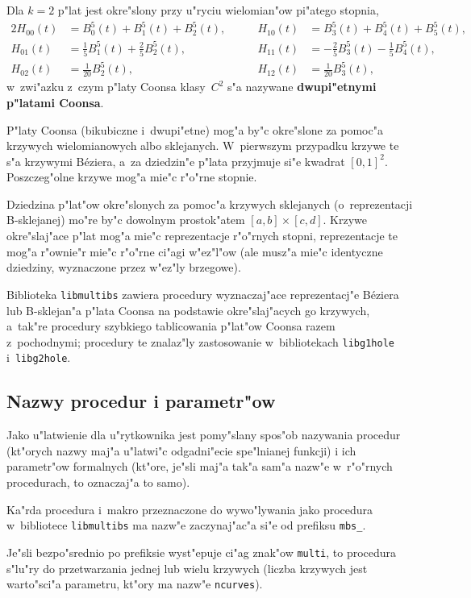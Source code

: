 Dla $k=2$ p"lat jest okre"slony przy u"ryciu wielomian"ow pi"atego stopnia,
\begin{alignat*}{2}
  H_{00}(t) &{}= B^5_0(t)+B^5_1(t)+B^5_2(t),\qquad &
  H_{10}(t) &{}= B^5_3(t)+B^5_4(t)+B^5_5(t), \\
  H_{01}(t) &{}= \frac{1}{5}B^5_1(t)+\frac{2}{5}B^5_2(t), \qquad &
  H_{11}(t) &{}= -\frac{2}{5}B^5_3(t)-\frac{1}{5}B^5_4(t), \\
  H_{02}(t) &{}= \frac{1}{20}B^5_2(t), \qquad &
  H_{12}(t) &{}= \frac{1}{20}B^5_3(t),
\end{alignat*}
w~zwi"azku z~czym p"laty Coonsa klasy~$C^2$ s"a nazywane \textbf{dwupi"etnymi
p"latami Coonsa}.

P"laty Coonsa (bikubiczne i~dwupi"etne) mog"a by"c okre"slone za pomoc"a
krzywych wielomianowych albo sklejanych. W~pierwszym przypadku krzywe te s"a
krzywymi B\'{e}ziera, a~za dziedzin"e p"lata przyjmuje si"e kwadrat $[0,1]^2$.
Poszczeg"olne krzywe mog"a mie"c r"o"rne stopnie.

Dziedzina p"lat"ow okre"slonych za pomoc"a krzywych sklejanych (o~reprezentacji
B-sklejanej) mo"re by"c dowolnym prostok"atem $[a,b]\times[c,d]$. Krzywe
okre"slaj"ace p"lat mog"a mie"c reprezentacje r"o"rnych stopni, reprezentacje
te mog"a r"ownie"r mie"c r"o"rne ci"agi w"ez"l"ow (ale musz"a mie"c identyczne
dziedziny, wyznaczone przez w"ez"ly brzegowe).

Biblioteka \texttt{libmultibs} zawiera procedury wyznaczaj"ace reprezentacj"e
B\'{e}ziera lub B-sklejan"a p"lata Coonsa na podstawie okre"slaj"acych go
krzywych, a~tak"re procedury szybkiego tablicowania p"lat"ow Coonsa razem
z~pochodnymi; procedury te znalaz"ly zastosowanie w~bibliotekach
\texttt{libg1hole} i~\texttt{libg2hole}.


\subsection{Nazwy procedur i parametr"ow}

Jako u"latwienie dla u"rytkownika jest pomy"slany spos"ob nazywania procedur
(kt"orych nazwy maj"a u"latwi"c odgadni"ecie spe"lnianej funkcji)
i ich parametr"ow formalnych (kt"ore, je"sli maj"a tak"a sam"a nazw"e
w~r"o"rnych procedurach, to oznaczaj"a to samo).

Ka"rda procedura i~makro przeznaczone do wywo"lywania jako procedura
w~bibliotece \texttt{libmultibs} ma nazw"e zaczynaj"ac"a si"e od prefiksu
\texttt{mbs\_}.

Je"sli bezpo"srednio po prefiksie wyst"epuje ci"ag znak"ow \texttt{multi},
to procedura s"lu"ry do przetwarzania jednej lub wielu krzywych (liczba
krzywych jest warto"sci"a parametru, kt"ory ma nazw"e \texttt{ncurves}).

